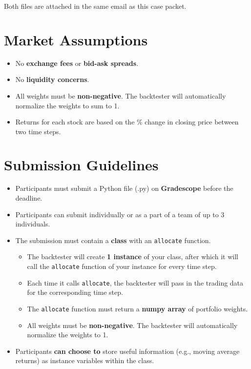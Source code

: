\documentclass{article}
\begin{document}
Both files are attached in the same email as this case packet.

\section{Market Assumptions}
\begin{itemize}
    \item No \textbf{exchange fees} or \textbf{bid-ask spreads}.
    \item No \textbf{liquidity concerns}.
    \item All weights must be \textbf{non-negative}. The backtester will automatically normalize the weights to sum to 1.
    \item Returns for each stock are based on the \% change in closing price between two time steps.
\end{itemize}

\section{Submission Guidelines}
\begin{itemize}
    \item Participants must submit a Python file (.py) on \textbf{Gradescope} before the deadline.
    \item Participants can submit individually or as a part of a team of up to 3 individuals.
    \item The submission must contain a \textbf{class} with an \texttt{allocate} function.
    \begin{itemize}
        \item The backtester will create \textbf{1 instance} of your class, after which it will call the \texttt{allocate} function of your instance for every time step.
        \item Each time it calls \texttt{allocate}, the backtester will pass in the trading data for the corresponding time step.
        \item The \texttt{allocate} function must return a \textbf{numpy array} of portfolio weights.
        \item All weights must be \textbf{non-negative}. The backtester will automatically normalize the weights to 1.
    \end{itemize}
    \item Participants \textbf{can choose to} store useful information (e.g., moving average returns) as instance variables within the class.
\end{itemize}
\end{document}
